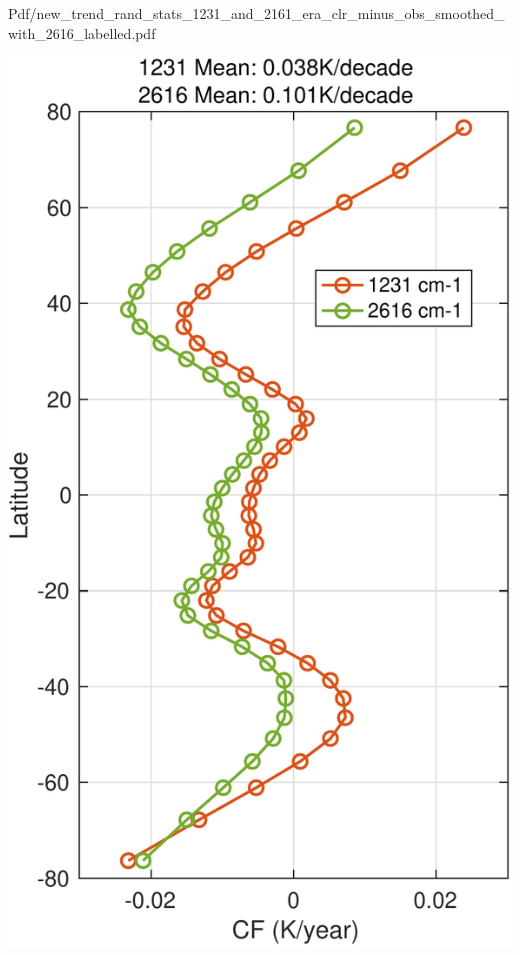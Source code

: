 \documentclass[presentation]{beamer}
\begin{document}
\begin{frame}[label={sec:org497e5b3}]{Pdf/new\_trend\_rand\_stats\_1231\_and\_2161\_era\_clr\_minus\_obs\_smoothed\_with\_2616\_labelled.pdf}
\begin{center}
\includegraphics[width=0.7\linewidth]{./Figs/Pdf/new_trend_rand_stats_1231_and_2161_era_clr_minus_obs_smoothed_with_2616_labelled.pdf}
\end{center}
\end{frame}
\end{document}
